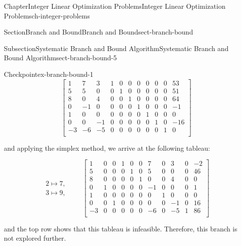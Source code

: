 \documentclass[oneside,10pt,]{book}
\numberwithin{equation}{section}
\newcommand{\amp}{&}
\begin{document}
\begin{chapterptx}{Chapter}{Integer Linear Optimization Problems}{}{Integer Linear Optimization Problems}{}{}{ch-integer-problems}
\begin{sectionptx}{Section}{Branch and Bound}{}{Branch and Bound}{}{}{sect-branch-bound}
\begin{subsectionptx}{Subsection}{Systematic Branch and Bound Algorithm}{}{Systematic Branch and Bound Algorithm}{}{}{sect-branch-bound-5}
\begin{inlineexercise}{Checkpoint}{}{ex-branch-bound-1}
\begin{equation*}
\left[\begin{array}{rrr|rrrrrrr|r} 1 \amp 7 \amp 3 \amp 1 \amp 0 \amp 0 \amp 0 \amp 0 \amp 0 \amp 0 \amp 53\\ 5 \amp 5 \amp 0 \amp 0 \amp 1 \amp 0 \amp 0 \amp 0 \amp 0 \amp 0 \amp 51\\ 8 \amp 0 \amp 4 \amp 0 \amp 0 \amp 1 \amp 0 \amp 0 \amp 0 \amp 0 \amp 64\\ 0 \amp -1 \amp 0 \amp 0 \amp 0 \amp 0 \amp 1 \amp 0 \amp 0 \amp 0 \amp -1\\ 1 \amp 0 \amp 0 \amp 0 \amp 0 \amp 0 \amp 0 \amp 1 \amp 0 \amp 0 \amp 0\\ 0 \amp 0 \amp -1 \amp 0 \amp 0 \amp 0 \amp 0 \amp 0 \amp 1 \amp 0 \amp -16\\ \hline -3 \amp -6 \amp -5 \amp 0 \amp 0 \amp 0 \amp 0 \amp 0 \amp 0 \amp 1 \amp 0\\ \end{array} \right]
\end{equation*}
%
\par
and applying the simplex method, we arrive at the following tableau:%
\par
%
\begin{equation*}
\begin{array}{r} 2 \mapsto 7, \\ 3 \mapsto 9, \end{array} \qquad \left[\begin{array}{rrr|rrrrrrr|r} 1 \amp 0 \amp 0 \amp 1 \amp 0 \amp 0 \amp 7 \amp 0 \amp 3 \amp 0 \amp -2\\ 5 \amp 0 \amp 0 \amp 0 \amp 1 \amp 0 \amp 5 \amp 0 \amp 0 \amp 0 \amp 46\\ 8 \amp 0 \amp 0 \amp 0 \amp 0 \amp 1 \amp 0 \amp 0 \amp 4 \amp 0 \amp 0\\ 0 \amp 1 \amp 0 \amp 0 \amp 0 \amp 0 \amp -1 \amp 0 \amp 0 \amp 0 \amp 1\\ 1 \amp 0 \amp 0 \amp 0 \amp 0 \amp 0 \amp 0 \amp 1 \amp 0 \amp 0 \amp 0\\ 0 \amp 0 \amp 1 \amp 0 \amp 0 \amp 0 \amp 0 \amp 0 \amp -1 \amp 0 \amp 16\\ \hline -3 \amp 0 \amp 0 \amp 0 \amp 0 \amp 0 \amp -6 \amp 0 \amp -5 \amp 1 \amp 86\\ \end{array} \right]
\end{equation*}
%
\par
and the top row shows that this tableau is infeasible. Therefore, this branch is not explored further.%
\par

\end{inlineexercise}
\end{subsectionptx}
\end{sectionptx}
\end{chapterptx}
\end{document}
